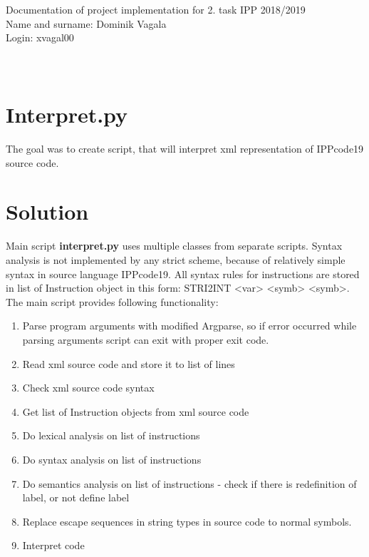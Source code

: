 \documentclass[10pt, a4paper]{article}
\begin{document}

\noindent Documentation of project implementation for 2. task IPP 2018/2019\\
Name and surname: Dominik Vagala\\
Login: xvagal00\\\\\\
 
\section*{Interpret.py}
The goal was to create script, that will interpret xml representation of IPPcode19 source code.
 
\section*{Solution}

Main script \textbf{interpret.py} uses multiple classes from separate scripts. Syntax analysis is not implemented by any strict scheme, because of relatively simple syntax in source language IPPcode19. All syntax rules for instructions are stored in list of Instruction object in this form: STRI2INT <var> <symb> <symb>. The main script provides following functionality:
\begin{enumerate}[itemsep=0mm]
	\item Parse program arguments with modified Argparse, so if error occurred while parsing arguments script can exit with proper exit code.
	\item Read xml source code and store it to list of lines
	\item Check xml source code syntax
	\item Get list of Instruction objects from xml source code
	\item Do lexical analysis on list of instructions
	\item Do syntax analysis on list of instructions
	\item Do semantics analysis on list of instructions - check if there is redefinition of label, or not define label
	\item Replace escape sequences in string types in source code to normal symbols.  
	\item Interpret code
\end{enumerate}
\end{document}
